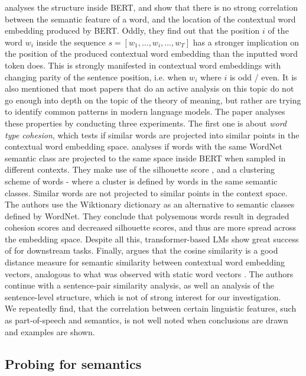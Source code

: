 \documentclass[a4paper,12pt,oneside,openright]{report}
\begin{document}
\cite{mickus19} analyses the structure inside BERT, and show that there is no strong correlation between the semantic feature of a word, and the location of the contextual word embedding produced by BERT.
Oddly, they find out that the position $i$ of the word $w_i$ inside the sequence $s = [w_1, \ldots, w_i, \ldots, w_T]$ has a stronger implication on the position of the produced contextual word embedding than the inputted word token does.
This is strongly manifested in contextual word embeddings with changing parity of the sentence position, i.e. when $w_i$ where $i$ is odd / even.
It is also mentioned that most papers that do an active analysis on this topic do not go enough into depth on the topic of the theory of meaning, but rather are trying to identify common patterns in modern language models.
The paper analyses these properties by conducting three experiments.
The first one is about \textit{word type cohesion}, which tests if similar words are projected into similar points in the contextual word embedding space.
\cite{mickus19} analyses if words with the same WordNet semantic class are projected to the same space inside BERT when sampled in different contexts.
They make use of the silhouette score \cite{rousseeuw87}, and a clustering scheme of words - where a cluster is defined by words in the same semantic classes.
Similar words are not projected to similar points in the context space.
The authors use the Wiktionary dictionary \cite{wiktionary} as an alternative to  semantic classes defined by WordNet.
They conclude that polysemous words result in degraded cohesion scores and decreased silhouette scores, and thus are more spread across the embedding space.
Despite all this, transformer-based LMs show great success of for downstream tasks.
Finally, \cite{mickus19} argues that the cosine similarity is a good distance measure for semantic similarity between contextual word embedding vectors, analogous to what was observed with static word vectors \cite{mikolov13}.
The authors continue with a sentence-pair similarity analysis, as well an analysis of the sentence-level structure, which is not of strong interest for our investigation. \\

We repeatedly find, that the correlation between certain linguistic features, such as part-of-speech and semantics, is not well noted when conclusions are drawn and examples are shown.

\subsection{Probing for semantics}
\end{document}

